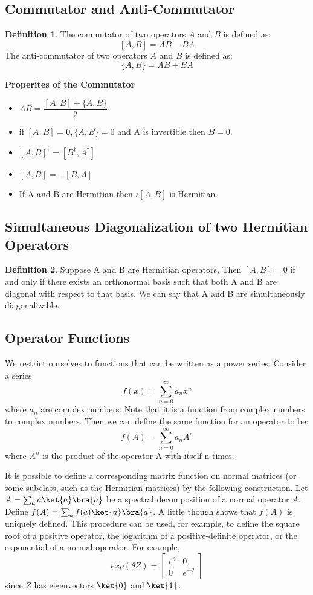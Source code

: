 \documentclass[12pt, oneside]{book}
\theoremstyle{definition}
\newtheorem{definition}{Definition}[section]
\theoremstyle{definition}
\theoremstyle{remark}
\begin{document}
\subsection{Commutator and Anti-Commutator}
\begin{definition}
    The commutator of two operators $A$ and $B$ is defined as:
    \[ [A,B]=AB-BA \]
    The anti-commutator of two operators $A$ and $B$ is defined as:
    \[ \{A,B\}=AB+BA \]
\end{definition}
\textbf{Properites of the Commutator}
\begin{itemize}
    \item $AB=\dfrac{[A,B]+\{A,B\}}{2}$
    \item if $[A,B]=0,\{A,B\}=0$ and A is invertible then $B=0$.
    \item $[A,B]^{\dagger}=[B^{\dagger},A^{\dagger}]$
    \item $[A,B]=-[B,A]$
    \item If A and B are Hermitian then $\iota [A,B]$ is Hermitian.
\end{itemize}

\subsection{Simultaneous Diagonalization of two Hermitian Operators}
\begin{definition}
    Suppose A and B are Hermitian operators, Then $[A,B]=0$ if and only if there exists an orthonormal basis
    such that both A and B are diagonal with respect to that basis. We can say that A and B are simultaneously diagonalizable.    
\end{definition}

\subsection{Operator Functions}
We restrict ourselves to functions that can be written as a power series. Consider a series
\[ f(x)=\sum_{n=0}^{\infty} a_nx^n \]
where $a_n$ are complex numbers. Note that it is a function from complex numbers to complex numbers. Then we can define the same function for an operator to be:
\[ f(A)=\sum_{n=0}^{\infty} a_nA^n \]
where $A^n$ is the product of the operator A with itself n times. 

It is possible to define a corresponding matrix function on normal matrices (or some subclass, such as the Hermitian matrices) by the following construction. Let $A=\sum_a a\ket{a}\bra{a}$ be a spectral decomposition of a normal operator $A$. Define $f(A)=\sum_a f(a)\ket{a}\bra{a}$. A little though shows that $f(A)$ is uniquely defined. This procedure can be used, for example, to define the square root of a positive operator, the logarithm of a positive-definite operator, or the exponential of a normal operator. For example,
\[
exp(\theta Z)=\begin{bmatrix} e^{\theta} & 0 \\ 0 & e^{-\theta} \end{bmatrix}
\]
since $Z$ has eigenvectors $\ket{0}$ and $\ket{1}$.
\end{document}
